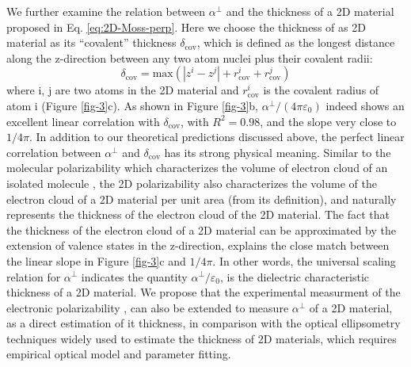 \documentclass[journal=ancac3,manuscript=article,email=true,hyperref=true,keywords=false]{achemso}
\begin{document}
We further examine the relation between $\alpha^{\perp}$ and the
thickness of a 2D material proposed in Eq. \ref{eq:2D-Moss-perp}. Here
we choose the thickness of as 2D material as its ``covalent''
thickness $\delta_{\mathrm{cov}}$, which is
defined as the longest distance along the z-direction between any two
atom nuclei plus their covalent radii:
\begin{equation}
  \label{eq:cov-thick}
  \delta_{\mathrm{cov}} = \mathrm{max}(|z^{i} - z^{j}|
  + r^{i}_{\mathrm{cov}} + r^{j}_{\mathrm{cov}})
\end{equation}
where i, j are two atoms in the 2D material and $r_{\mathrm{cov}}^{i}$
is the covalent radius of atom i (Figure \ref{fig-3}c). As shown in
Figure \ref{fig-3}b, $\alpha^{\perp}/(4 \pi \varepsilon_{0})$ indeed
shows an excellent linear correlation with $\delta_{\mathrm{cov}}$,
with $R^{2}=0.98$, and the slope very close to $1/4\pi$. In addition
to our theoretical predictions discussed above, the perfect linear
correlation between $\alpha^{\perp}$ and $\delta_{\mathrm{cov}}$ has
its strong physical meaning. Similar to the molecular polarizability
which characterizes the volume of electron cloud of an isolated
molecule \cite{Israelachvili_2011}, the 2D polarizability also
characterizes the volume of the electron cloud of a 2D material per
unit area (from its definition), and naturally represents the
thickness of the electron cloud of the 2D material. The fact that the
thickness of the electron cloud of a 2D material can be approximated
by the extension of valence states in the z-direction, explains the
close match between the linear slope in Figure \ref{fig-3}c and
$1/4\pi$. In other words, the universal scaling relation for
$\alpha^{\perp}$ indicates the quantity
$\alpha^{\perp}/\varepsilon_{0}$, is the dielectric characteristic
thickness of a 2D material. We propose that the experimental
measurment of the electronic polarizability
\cite{Antoine_1999,Cherniavskaya_2003,Krauss_1999_EFM}, can also be
extended to measure $\alpha^{\perp}$ of a 2D material, as a direct
estimation of it thickness, in comparison with the optical
ellipsometry techniques \cite{Weber_2010} widely used to estimate the
thickness of 2D materials, which requires empirical optical model and
parameter fitting.
\end{document}
